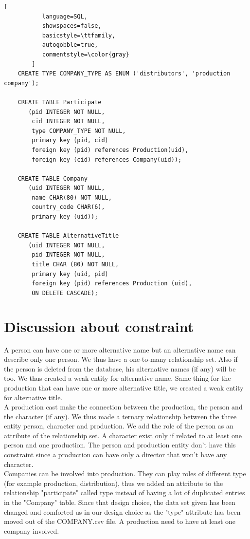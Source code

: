 \documentclass{article}
\begin{document}
\begin{lstlisting}[
           language=SQL,
           showspaces=false,
           basicstyle=\ttfamily,
           autogobble=true,
           commentstyle=\color{gray}
        ]
    CREATE TYPE COMPANY_TYPE AS ENUM ('distributors', 'production company');
    
    CREATE TABLE Participate
       (pid INTEGER NOT NULL,
        cid INTEGER NOT NULL,
        type COMPANY_TYPE NOT NULL,
        primary key (pid, cid)
        foreign key (pid) references Production(uid),
        foreign key (cid) references Company(uid));
    
    CREATE TABLE Company
       (uid INTEGER NOT NULL,
        name CHAR(80) NOT NULL,
        country_code CHAR(6),
        primary key (uid));
    
    CREATE TABLE AlternativeTitle
       (uid INTEGER NOT NULL,
        pid INTEGER NOT NULL,
        title CHAR (80) NOT NULL,
        primary key (uid, pid)
        foreign key (pid) references Production (uid),
        ON DELETE CASCADE);
\end{lstlisting}


\section{Discussion about constraint}
    A person can have one or more alternative name but an alternative name can describe only one person. We thus have a one-to-many relationship set. Also if the person is deleted from the database, his alternative names (if any) will be too. We thus created a weak entity for alternative name.
    Same thing for the production that can have one or more alternative title, we created a weak entity for alternative title. \\
    
    A production cast make the connection between the production, the person and the character (if any). We thus made a ternary relationship between the three entity person, character and production. We add the role of the person as an attribute of the relationship set. A character exist only if related to at least one person and one production. The person and production entity don't have this constraint since a production can have only a director that won't have any character.  \\
    
    Companies can be involved into production. They can play roles of different type (for example production, distribution), thus we added an attribute to the relationship "participate" called type instead of having a lot of duplicated entries in the "Company" table. Since that design choice, the data set given has been changed and comforted us in our design choice as the "type" attribute has been moved out of the COMPANY.csv file. A production need to have at least one company involved. 
 
\end{document}
